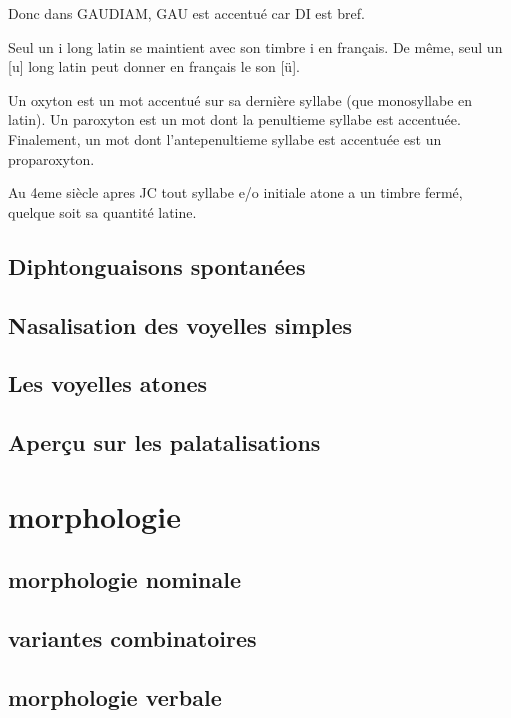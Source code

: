 \documentclass[a4paper]{report}
\theoremstyle{definition}
\theoremstyle{remark}
\begin{document}
Donc dans GAUDIAM, GAU est accentué car DI est bref. \par

Seul un i long latin se maintient avec son timbre i en français. De même, seul un [u] long latin peut donner en français le son [ü]. \par 

Un oxyton est un mot accentué sur sa dernière syllabe (que monosyllabe en latin). Un paroxyton est un mot dont la penultieme syllabe est accentuée. Finalement, un mot dont l'antepenultieme syllabe est accentuée est un proparoxyton. 

Au 4eme siècle apres JC tout syllabe e/o initiale atone a un timbre fermé, quelque soit sa quantité latine.

\subsection{Diphtonguaisons spontanées}

\subsection{Nasalisation des voyelles simples}

\subsection{Les voyelles atones}

\subsection{Aperçu sur les palatalisations}

\section{morphologie}

\subsection{morphologie nominale}

\subsection{variantes combinatoires}

\subsection{morphologie verbale}
\end{document}
